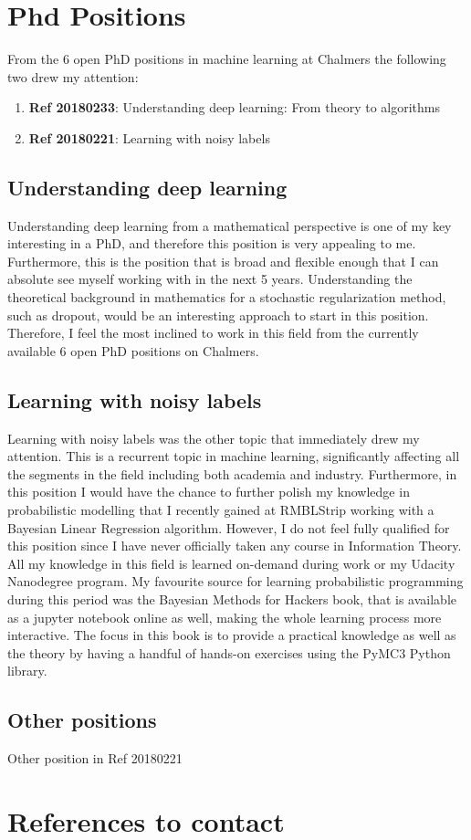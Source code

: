 \documentclass[12pt]{article}
\begin{document}
\section*{Phd Positions}
From the 6 open PhD positions in machine learning at Chalmers the following two drew my attention:
\begin{enumerate}
    \item \textbf{Ref 20180233}: Understanding deep learning: From theory to algorithms
    \item \textbf{Ref 20180221}: Learning with noisy labels
\end{enumerate}

\subsection*{Understanding deep learning}
Understanding deep learning from a mathematical perspective is one of my key interesting in a PhD, and therefore this position is very appealing to me. Furthermore, this is the position that is broad and flexible enough that I can absolute see myself working with in the next 5 years. Understanding the theoretical background in mathematics for a stochastic regularization method, such as dropout, would be an interesting approach to start in this position. Therefore, I feel the most inclined to work in this field from the currently available 6 open PhD positions on Chalmers.

\subsection*{Learning with noisy labels}
Learning with noisy labels was the other topic that immediately drew my attention. This is a recurrent topic in machine learning, significantly affecting all the segments in the field including both academia and industry. Furthermore, in this position I would have the chance to further polish my knowledge in probabilistic modelling that I recently gained at RMBLStrip working with a Bayesian Linear Regression algorithm. However, I do not feel fully qualified for this position since I have never officially taken any course in Information Theory. All my knowledge in this field is learned on-demand during work or my Udacity Nanodegree program. My favourite source for learning probabilistic programming during this period was the Bayesian Methods for Hackers book\cite{probabilistic_programming}, that is available as a jupyter notebook online as well, making the whole learning process more interactive. The focus in this book is to provide a practical knowledge as well as the theory by having a handful of hands-on exercises using the PyMC3 Python library.

\subsection*{Other positions}
Other position in Ref 20180221

\section*{References to contact}



\end{document}
